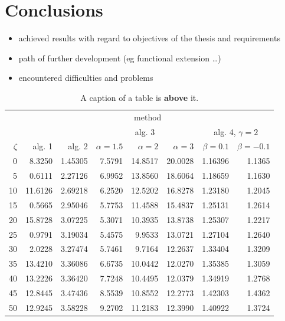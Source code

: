 \documentclass[a4paper,twoside,12pt]{book}
\begin{document}
 
 

\chapter{Conclusions}
\begin{itemize}
\item achieved results with regard to objectives of the thesis and requirements
\item path of further development (eg functional extension …)
\item encountered difficulties and problems
\end{itemize}

 
\begin{table}
\centering
\caption{A caption of a table is \textbf{above} it.}
\label{id:tab:wyniki}
\begin{tabular}{rrrrrrrr}
\toprule
	         &                                     \multicolumn{7}{c}{method}                                      \\
	         \cmidrule{2-8}
	         &         &         &        \multicolumn{3}{c}{alg. 3}        & \multicolumn{2}{c}{alg. 4, $\gamma = 2$} \\
	         \cmidrule(r){4-6}\cmidrule(r){7-8}
	$\zeta$ &     alg. 1 &   alg. 2 & $\alpha= 1.5$ & $\alpha= 2$ & $\alpha= 3$ &   $\beta = 0.1$  &   $\beta = -0.1$ \\
\midrule
	       0 &  8.3250 & 1.45305 &       7.5791 &    14.8517 &    20.0028 & 1.16396 &                       1.1365 \\
	       5 &  0.6111 & 2.27126 &       6.9952 &    13.8560 &    18.6064 & 1.18659 &                       1.1630 \\
	      10 & 11.6126 & 2.69218 &       6.2520 &    12.5202 &    16.8278 & 1.23180 &                       1.2045 \\
	      15 &  0.5665 & 2.95046 &       5.7753 &    11.4588 &    15.4837 & 1.25131 &                       1.2614 \\
	      20 & 15.8728 & 3.07225 &       5.3071 &    10.3935 &    13.8738 & 1.25307 &                       1.2217 \\
	      25 &  0.9791 & 3.19034 &       5.4575 &     9.9533 &    13.0721 & 1.27104 &                       1.2640 \\
	      30 &  2.0228 & 3.27474 &       5.7461 &     9.7164 &    12.2637 & 1.33404 &                       1.3209 \\
	      35 & 13.4210 & 3.36086 &       6.6735 &    10.0442 &    12.0270 & 1.35385 &                       1.3059 \\
	      40 & 13.2226 & 3.36420 &       7.7248 &    10.4495 &    12.0379 & 1.34919 &                       1.2768 \\
	      45 & 12.8445 & 3.47436 &       8.5539 &    10.8552 &    12.2773 & 1.42303 &                       1.4362 \\
	      50 & 12.9245 & 3.58228 &       9.2702 &    11.2183 &    12.3990 & 1.40922 &                       1.3724 \\
\bottomrule
\end{tabular}
\end{table}  
\end{document}
